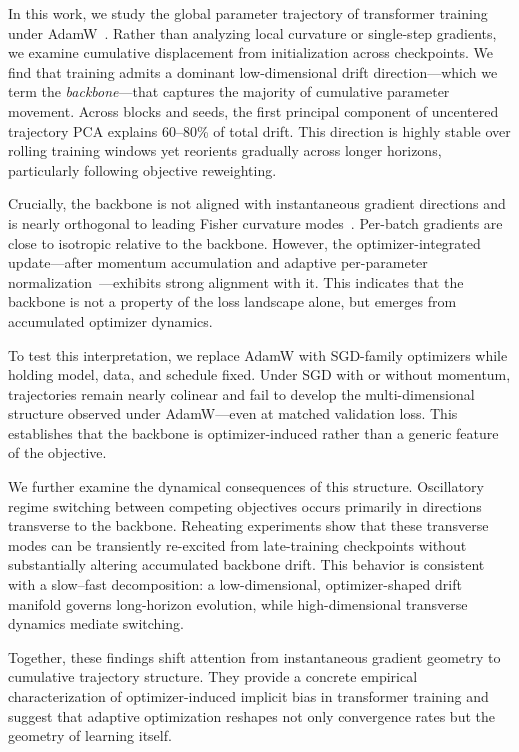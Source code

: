 \documentclass[11pt,a4paper]{article}
\begin{document}
In this work, we study the global parameter trajectory of transformer training
under AdamW~\citep{loshchilov2019decoupled}.  Rather than analyzing local
curvature or single-step gradients, we examine cumulative displacement from
initialization across checkpoints.  We find that training admits a dominant
low-dimensional drift direction---which we term the \emph{backbone}---that
captures the majority of cumulative parameter movement.  Across blocks and
seeds, the first principal component of uncentered trajectory PCA explains
60--80\% of total drift.  This direction is highly stable over rolling training
windows yet reorients gradually across longer horizons, particularly following
objective reweighting.

Crucially, the backbone is not aligned with instantaneous gradient directions
and is nearly orthogonal to leading Fisher curvature
modes~\citep{martens2020new}.  Per-batch gradients are close to isotropic
relative to the backbone.  However, the optimizer-integrated update---after
momentum accumulation and adaptive per-parameter
normalization~\citep{kingma2015adam}---exhibits strong alignment with it.  This
indicates that the backbone is not a property of the loss landscape alone,
but emerges from accumulated optimizer dynamics.

To test this interpretation, we replace AdamW with SGD-family optimizers while
holding model, data, and schedule fixed.  Under SGD with or without momentum,
trajectories remain nearly colinear and fail to develop the multi-dimensional
structure observed under AdamW---even at matched validation loss.  This
establishes that the backbone is optimizer-induced rather than a generic feature
of the objective.

We further examine the dynamical consequences of this structure.  Oscillatory
regime switching between competing objectives occurs primarily in directions
transverse to the backbone.  Reheating experiments show that these transverse
modes can be transiently re-excited from late-training checkpoints without
substantially altering accumulated backbone drift.  This behavior is consistent
with a slow--fast decomposition: a low-dimensional, optimizer-shaped drift
manifold governs long-horizon evolution, while high-dimensional transverse
dynamics mediate switching.

Together, these findings shift attention from instantaneous gradient geometry to
cumulative trajectory structure.  They provide a concrete empirical
characterization of optimizer-induced implicit bias in transformer training and
suggest that adaptive optimization reshapes not only convergence rates but the
geometry of learning itself.
\end{document}
